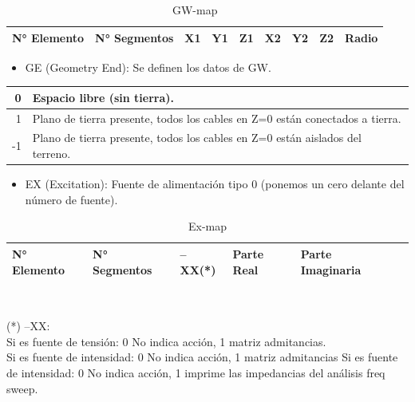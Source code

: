 \documentclass[12pt]{article}
\begin{document}
\begin{table}[H]
    \centering
    \begin{tabular}{|l|l|l|l|l|l|l|l|l|}
	\hline
	N° Elemento & N° Segmentos & X1 & Y1 & Z1 & X2 & Y2 & Z2 & Radio \\
	\hline
    \end{tabular}
    \caption{GW-map}
\end{table}

\begin{itemize}%
    \item GE (Geometry End): Se definen los datos de GW.
\end{itemize}

\begin{table}[H]
    \centering
    \begin{tabular}{|r|l|}
	\hline
	0 & Espacio libre (sin tierra).\\\hline
	1 & Plano de tierra presente, todos los cables en Z=0 est\'an conectados a tierra.\\\hline
	-1 & Plano de tierra presente, todos los cables en Z=0 est\'an aislados del terreno.\\
	\hline
    \end{tabular}
\end{table}

\begin{itemize}
    \item EX (Excitation): Fuente de alimentación tipo 0 (ponemos un cero delante del número de fuente).
\end{itemize}

\begin{table}[H]
    \centering
    \caption{Ex-map}
    \begin{tabular}{|l|l|l|l|l|l|}
	\hline
	N° Elemento & N° Segmentos & --XX(*) & Parte Real & Parte Imaginaria \\
	\hline
    \end{tabular}\\
    \raggedright
    \hspace{1.5em}(*) --XX:\\
    \hspace{3em} Si es fuente de tensi\'on: 0 No indica acci\'on, 1 matriz admitancias.\\
    \hspace{3em} Si es fuente de intensidad: 0 No indica acción, 1 matriz admitancias Si es fuente de intensidad: 0 No indica acción, 1 imprime las impedancias del an\'alisis freq sweep.
\end{table}
\end{document}
